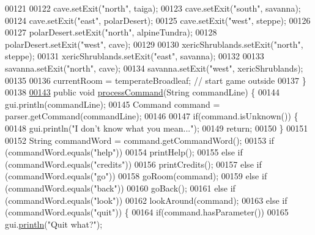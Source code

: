\begin{DoxyCode}
00121 
00122         cave.setExit(\textcolor{stringliteral}{"north"}, taiga);
00123         cave.setExit(\textcolor{stringliteral}{"south"}, savanna);
00124         cave.setExit(\textcolor{stringliteral}{"east"}, polarDesert);
00125         cave.setExit(\textcolor{stringliteral}{"west"}, steppe);
00126 
00127         polarDesert.setExit(\textcolor{stringliteral}{"north"}, alpineTundra);
00128         polarDesert.setExit(\textcolor{stringliteral}{"west"}, cave);
00129 
00130         xericShrublands.setExit(\textcolor{stringliteral}{"north"}, steppe);
00131         xericShrublands.setExit(\textcolor{stringliteral}{"east"}, savanna);
00132 
00133         savanna.setExit(\textcolor{stringliteral}{"north"}, cave);
00134         savanna.setExit(\textcolor{stringliteral}{"west"}, xericShrublands);
00135 
00136         currentRoom = temperateBroadleaf;  \textcolor{comment}{// start game outside}
00137     \}
00138 
\hypertarget{GameEngine_8java_source_l00143}{}\hyperlink{classGameEngine_ad7133885f313fa99bca3bb7cb8272f64}{00143}     \textcolor{keyword}{public} \textcolor{keywordtype}{void} \hyperlink{classGameEngine_ad7133885f313fa99bca3bb7cb8272f64}{processCommand}(String commandLine) \{
00144         gui.println(commandLine);
00145         Command command = parser.getCommand(commandLine);
00146 
00147         \textcolor{keywordflow}{if}(command.isUnknown()) \{
00148             gui.println(\textcolor{stringliteral}{"I don't know what you mean..."});
00149             \textcolor{keywordflow}{return};
00150         \}
00151 
00152         String commandWord = command.getCommandWord();
00153         \textcolor{keywordflow}{if} (commandWord.equals(\textcolor{stringliteral}{"help"}))
00154             printHelp();
00155         \textcolor{keywordflow}{else} \textcolor{keywordflow}{if} (commandWord.equals(\textcolor{stringliteral}{"credits"}))
00156             printCredits();
00157         \textcolor{keywordflow}{else} \textcolor{keywordflow}{if} (commandWord.equals(\textcolor{stringliteral}{"go"}))
00158             goRoom(command);
00159         \textcolor{keywordflow}{else} \textcolor{keywordflow}{if} (commandWord.equals(\textcolor{stringliteral}{"back"}))
00160             goBack();
00161         \textcolor{keywordflow}{else} \textcolor{keywordflow}{if} (commandWord.equals(\textcolor{stringliteral}{"look"}))
00162             lookAround(command);
00163         \textcolor{keywordflow}{else} \textcolor{keywordflow}{if} (commandWord.equals(\textcolor{stringliteral}{"quit"})) \{
00164             \textcolor{keywordflow}{if}(command.hasParameter())
00165                 gui.\hyperlink{classUserInterface_a79f606b4b1f5d1523e50eea00039ed94}{println}(\textcolor{stringliteral}{"Quit what?"});

\end{DoxyCode}
